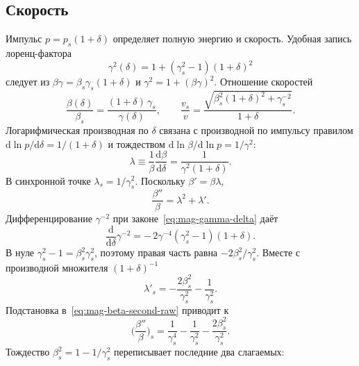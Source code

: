 \subsection{Скорость}
\label{sec:velocity}

Импульс $p=p_s(1+\delta)$ определяет полную энергию и скорость. Удобная запись лоренц-фактора
\begin{equation}
\label{eq:mag-gamma-delta}
\gamma^2(\delta)=1+(\gamma_s^2-1)(1+\delta)^2
\end{equation}
следует из $\beta\gamma=\beta_s\gamma_s(1+\delta)$ и $\gamma^2=1+(\beta\gamma)^2$. Отношение скоростей
\begin{equation}
\label{eq:mag-beta-exact}
\frac{\beta(\delta)}{\beta_s}
=\frac{(1+\delta)\,\gamma_s}{\gamma(\delta)},
\qquad
\frac{v_s}{v}
=\frac{\sqrt{\beta_s^2(1+\delta)^2+\gamma_s^{-2}}}{1+\delta}.
\end{equation}
Логарифмическая производная по $\delta$ связана с производной по импульсу правилом $\mathrm{d}\ln p/\mathrm{d}\delta=1/(1+\delta)$ и тождеством $\mathrm{d}\ln\beta/\mathrm{d}\ln p=1/\gamma^2$:
\begin{equation}
\label{eq:mag-lambda}
\lambda\equiv\frac{1}{\beta}\frac{\mathrm{d}\beta}{\mathrm{d}\delta}
=\frac{1}{\gamma^2(1+\delta)}.
\end{equation}
В синхронной точке $\lambda_s=1/\gamma_s^2$. Поскольку $\beta'=\beta\lambda$,
\begin{equation}
\label{eq:mag-beta-second-raw}
\frac{\beta''}{\beta}=\lambda^2+\lambda'.
\end{equation}
Дифференцирование $\gamma^{-2}$ при законе~\eqref{eq:mag-gamma-delta} даёт
\begin{equation}
\label{eq:mag-dgamma}
\frac{\mathrm{d}}{\mathrm{d}\delta}\gamma^{-2}
=-\,2\gamma^{-4}(\gamma_s^2-1)(1+\delta).
\end{equation}
В нуле $\gamma_s^2-1=\beta_s^2\gamma_s^2$, поэтому правая часть равна $-2\beta_s^2/\gamma_s^2$. Вместе с производной множителя $(1+\delta)^{-1}$
\begin{equation}
\label{eq:mag-lambda-prime}
\lambda'_s=-\frac{2\beta_s^2}{\gamma_s^2}-\frac{1}{\gamma_s^2}.
\end{equation}
Подстановка в~\eqref{eq:mag-beta-second-raw} приводит к
\begin{equation}
\label{eq:mag-beta-second-alg}
\Biggl(\frac{\beta''}{\beta}\Biggr)_s
=\frac{1}{\gamma_s^4}-\frac{1}{\gamma_s^2}-\frac{2\beta_s^2}{\gamma_s^2}.
\end{equation}
Тождество $\beta_s^2=1-1/\gamma_s^2$ переписывает последние два слагаемых:
